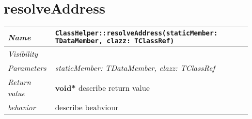  \section{resolveAddress}
\begin{longtable}{p{3cm} @{\hskip 1cm} p{12cm}}
 \hline
\textit{Name} & \texttt{ClassHelper::resolveAddress(staticMember: TDataMember, clazz: TClassRef)}\\
\hline
 \textit{Visibility} & \\
\hline
\textit{Parameters} & \textit{staticMember: TDataMember, clazz: TClassRef}\\
\hline
\textit{Return value} & \textbf{ void*} describe return value\\
  \hline
 \textit{behavior} & describe beahviour \\
\hline
\end{longtable} \pagebreak
 